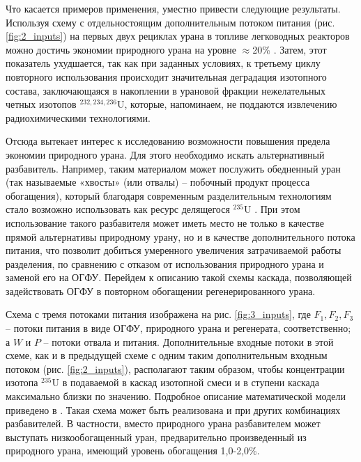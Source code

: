 
Что касается примеров применения, уместно привести следующие результаты. Используя схему с отдельностоящим дополнительным потоком питания (рис. \ref{fig:2_inputs}) на первых двух рециклах урана в топливе легководных реакторов можно достичь экономии природного урана на уровне $\approx$20\% \cite{smirnovApplyingEnrichmentCapacities2018}. Затем, этот показатель ухудшается, так как при заданных условиях, к третьему циклу повторного использования происходит значительная деградация изотопного состава, заключающаяся в накоплении в урановой фракции нежелательных четных изотопов $^{232,234,236}$U, которые, напоминаем, не поддаются извлечению радиохимическими технологиями.

Отсюда вытекает интерес к исследованию возможности повышения предела экономии природного урана. Для этого необходимо искать альтернативный разбавитель. Например, таким материалом может послужить обедненный уран (так называемые «хвосты» (или отвалы) -- побочный продукт процесса обогащения), который благодаря современным разделительным технологиям стало возможно использовать как ресурс делящегося $^{235}$U \cite{oecdManagementDepletedUranium2001, ITOGIDEYaTELNOSTIGOSUDARSTVENNOY}. При этом использование такого разбавителя может иметь место не только в качестве прямой альтернативы природному урану, но и в качестве дополнительного потока питания, что позволит добиться умеренного увеличения затрачиваемой работы разделения, по сравнению с отказом от использования природного урана и заменой его на ОГФУ. Перейдем к описанию такой схемы каскада, позволяющей задействовать ОГФУ в повторном обогащении регенерированного урана.

Схема с тремя потоками питания изображена на рис. \ref{fig:3_inputs}, где $F_{1}, F_{2}, F_{3}$ -- потоки питания в виде ОГФУ, природного урана и регенерата, соответственно; а $W$ и $P$ -- потоки отвала и питания. Дополнительные входные потоки в этой схеме, как и в предыдущей схеме с одним таким дополнительным входным потоком (рис. \ref{fig:2_inputs}), располагают таким образом, чтобы концентрации изотопа $^{235}$U в подаваемой в каскад изотопной смеси и в ступени каскада максимально близки по значению. Подробное описание математической модели приведено в \cite{smirnovEnrichmentRegeneratedUranium2014}. Такая схема может быть реализована и при других комбинациях разбавителей. В частности, вместо природного урана разбавителем может выступать низкообогащенный уран, предварительно произведенный из природного урана, имеющий уровень обогащения 1,0-2,0\%. 

